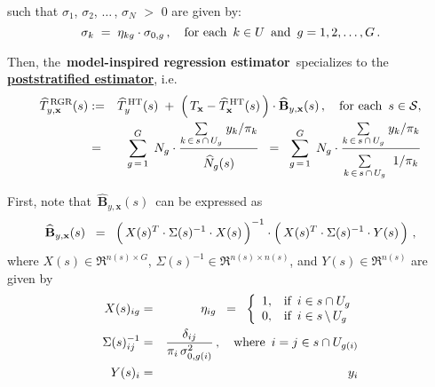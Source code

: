 \begin{example}
\begin{enumerate}
	such that
	$\sigma_{1}$, $\sigma_{2}$, $\ldots$\,, $\sigma_{N}$ $>$ $0$ are given by:
	\begin{equation*}
	\sigma_{k} \; = \; \eta_{kg}\cdot\sigma_{0,g}\,,
	\quad\textnormal{for each \,$k \in U$\, and \,$g = 1,2,\ldots,G$}\,.
	\end{equation*}
\end{enumerate}
\renewcommand{\theenumi}{\roman{enumi}}
\renewcommand{\labelenumi}{\textnormal{(\theenumi)}$\;\;$}
Then, the \,\textbf{model-inspired regression estimator}\,
specializes to the \,\underline{\textbf{poststratified estimator}}, i.e.
\begin{eqnarray*}
\widehat{T}^{\,\textnormal{RGR}}_{y,\mathbf{x}}(s)
& := &
	\widehat{T}^{\,\textnormal{HT}}_{y}(s)
	\; + \;
	\left(\,T_{\mathbf{x}} - \widehat{T}^{\,\textnormal{HT}}_{\mathbf{x}}(s) \,\right)
	\cdot
	\widehat{\mathbf{B}}_{y,\mathbf{x}}(s)\,,
	\quad\textnormal{for each \,$s \in \mathcal{S}$},
\\
& = &
	\overset{G}{\underset{g\,=\,1}{\sum}}\;\, N_{g}
	\cdot
	\dfrac{
		\underset{k\,\in\,s\,\cap\,U_{g}}{\sum}\;y_{k}/\pi_{k}
		}{
		\overset{{\color{white}.}}{\widehat{N}_{g}(s)}
		}
\;\; = \;\;
	\overset{G}{\underset{g\,=\,1}{\sum}}\;\, N_{g}
	\cdot
	\dfrac{
		\underset{k\,\in\,s\,\cap\,U_{g}}{\sum}\;y_{k}/\pi_{k}
		}{
		\underset{k\,\in\,s\,\cap\,U_{g}}{\overset{{\color{white}.}}{\sum}}\;\;1/\pi_{k}
		}
\end{eqnarray*}
\end{example}
\proof
First, note that \,$\widehat{\mathbf{B}}_{y,\mathbf{x}}(s)$\, can be expressed as
\begin{equation*}
\widehat{\mathbf{B}}_{y,\mathbf{x}}(s)
\;\; = \;\;
	\left(\,X(s)^{T} \overset{{\color{white}!}}{\cdot} \Sigma(s)^{-1} \cdot X(s)\,\right)^{-1}
	\cdot
	\left(\,X(s)^{T} \overset{{\color{white}!}}{\cdot} \Sigma(s)^{-1} \cdot Y(s) \,\right)\,,
\end{equation*}
where $X(s) \in \Re^{n(s) \times G}$, $\Sigma(s)^{-1} \in \Re^{n(s) \times n(s)}$, and $Y(s) \in \Re^{n(s)}$
are given by
\begin{eqnarray*}
X(s)_{ig}
& = &
	\eta_{ig}
\;\; = \;\;
	\left\{\begin{array}{cl}
		1, &  \textnormal{if \,$i \in s \cap U_{g}$}
		\\
		0, & \textnormal{if \,$i \in s\,\backslash\,U_{g}$}
	\end{array}\right.
\\
\Sigma(s)^{-1}_{ij}
& = &
	\dfrac{\delta_{ij}}{\pi_{i}\,\sigma^{2}_{0,g(i)}}\,,
	\quad
	\textnormal{where \,$i = j \in s \cap U_{g(i)}$}
\\
Y(s)_{i}
& = &
	y_{i}
\end{eqnarray*}
